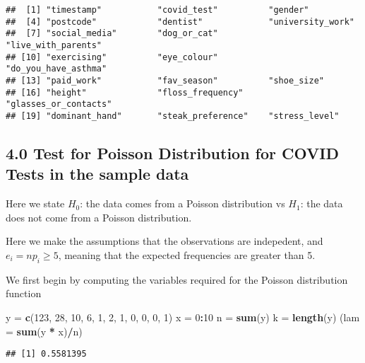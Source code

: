 \documentclass[
]{article}
\newenvironment{Shaded}{\begin{snugshade}}{\end{snugshade}}
\newcommand{\DataTypeTok}[1]{\textcolor[rgb]{0.13,0.29,0.53}{#1}}
\newcommand{\DecValTok}[1]{\textcolor[rgb]{0.00,0.00,0.81}{#1}}
\newcommand{\KeywordTok}[1]{\textcolor[rgb]{0.13,0.29,0.53}{\textbf{#1}}}
\newcommand{\NormalTok}[1]{#1}
\newcommand{\OperatorTok}[1]{\textcolor[rgb]{0.81,0.36,0.00}{\textbf{#1}}}
\newcommand{\StringTok}[1]{\textcolor[rgb]{0.31,0.60,0.02}{#1}}
\begin{document}
\begin{verbatim}
##  [1] "timestamp"           "covid_test"          "gender"             
##  [4] "postcode"            "dentist"             "university_work"    
##  [7] "social_media"        "dog_or_cat"          "live_with_parents"  
## [10] "exercising"          "eye_colour"          "do_you_have_asthma" 
## [13] "paid_work"           "fav_season"          "shoe_size"          
## [16] "height"              "floss_frequency"     "glasses_or_contacts"
## [19] "dominant_hand"       "steak_preference"    "stress_level"
\end{verbatim}

\hypertarget{test-for-poisson-distribution-for-covid-tests-in-the-sample-data}{%
\subsection{4.0 Test for Poisson Distribution for COVID Tests in the
sample
data}\label{test-for-poisson-distribution-for-covid-tests-in-the-sample-data}}

Here we state \(H_0\): the data comes from a Poisson distribution vs
\(H_1\): the data does not come from a Poisson distribution.

Here we make the assumptions that the observations are indepedent, and
\(e_i = np_i \geq 5\), meaning that the expected frequencies are greater
than 5.

We first begin by computing the variables required for the Poisson
distribution function

\begin{Shaded}
\begin{Highlighting}[]
\NormalTok{y =}\StringTok{ }\KeywordTok{c}\NormalTok{(}\DecValTok{123}\NormalTok{, }\DecValTok{28}\NormalTok{, }\DecValTok{10}\NormalTok{, }\DecValTok{6}\NormalTok{, }\DecValTok{1}\NormalTok{, }\DecValTok{2}\NormalTok{, }\DecValTok{1}\NormalTok{, }\DecValTok{0}\NormalTok{, }\DecValTok{0}\NormalTok{, }\DecValTok{0}\NormalTok{, }\DecValTok{1}\NormalTok{)}
\NormalTok{x =}\StringTok{ }\DecValTok{0}\OperatorTok{:}\DecValTok{10}
\NormalTok{n =}\StringTok{ }\KeywordTok{sum}\NormalTok{(y)}
\NormalTok{k =}\StringTok{ }\KeywordTok{length}\NormalTok{(y)}
\NormalTok{(}\DataTypeTok{lam =} \KeywordTok{sum}\NormalTok{(y }\OperatorTok{*}\StringTok{ }\NormalTok{x)}\OperatorTok{/}\NormalTok{n)}
\end{Highlighting}
\end{Shaded}

\begin{verbatim}
## [1] 0.5581395
\end{verbatim}
\end{document}
